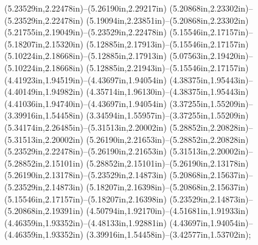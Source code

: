 (5.23529in,2.22478in)--(5.26190in,2.29217in) (5.20868in,2.23302in)--(5.23529in,2.22478in) (5.19094in,2.23851in)--(5.20868in,2.23302in) (5.21755in,2.19049in)--(5.23529in,2.22478in) (5.15546in,2.17157in)--(5.18207in,2.15320in) (5.12885in,2.17913in)--(5.15546in,2.17157in) (5.10224in,2.18668in)--(5.12885in,2.17913in) (5.07563in,2.19420in)--(5.10224in,2.18668in) (5.12885in,2.21943in)--(5.15546in,2.17157in) (4.41923in,1.94519in)--(4.43697in,1.94054in) (4.38375in,1.95443in)--(4.40149in,1.94982in) (4.35714in,1.96130in)--(4.38375in,1.95443in) (4.41036in,1.94740in)--(4.43697in,1.94054in) (3.37255in,1.55209in)--(3.39916in,1.54458in) (3.34594in,1.55957in)--(3.37255in,1.55209in) (5.34174in,2.26485in)--(5.31513in,2.20002in) (5.28852in,2.20828in)--(5.31513in,2.20002in) (5.26190in,2.21653in)--(5.28852in,2.20828in) (5.23529in,2.22478in)--(5.26190in,2.21653in) (5.31513in,2.20002in)--(5.28852in,2.15101in) (5.28852in,2.15101in)--(5.26190in,2.13178in) (5.26190in,2.13178in)--(5.23529in,2.14873in) (5.20868in,2.15637in)--(5.23529in,2.14873in) (5.18207in,2.16398in)--(5.20868in,2.15637in) (5.15546in,2.17157in)--(5.18207in,2.16398in) (5.23529in,2.14873in)--(5.20868in,2.19391in) (4.50794in,1.92170in)--(4.51681in,1.91933in) (4.46359in,1.93352in)--(4.48133in,1.92881in) (4.43697in,1.94054in)--(4.46359in,1.93352in) (3.39916in,1.54458in)--(3.42577in,1.53702in);
